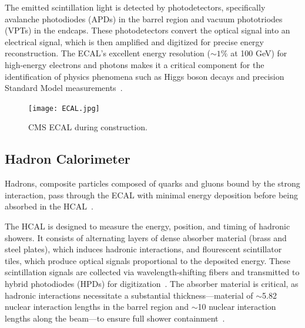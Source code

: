 The emitted scintillation light is detected by photodetectors, specifically avalanche photodiodes (APDs) in the barrel region and vacuum phototriodes (VPTs) in the endcaps. These photodetectors convert the optical signal into an electrical signal, which is then amplified and digitized for precise energy reconstruction. The ECAL’s excellent energy resolution (\(\sim1\%\) at 100 GeV) for high-energy electrons and photons makes it a critical component for the identification of physics phenomena such as Higgs boson decays and precision Standard Model measurements~\cite{CMS:ECALPerf, CMS:ECALTDR, CMS:JINST}.

\begin{figure}[!hbt]
    \begin{center}
        \texttt{[image: ECAL.jpg]}
        \caption{CMS ECAL during construction.}
        \label{fig:ECAL}
    \end{center}
\end{figure}



\subsection{Hadron Calorimeter}

Hadrons, composite particles composed of quarks and gluons bound by the strong interaction, pass through the ECAL with minimal energy deposition before being absorbed in the HCAL~\cite{CERN-LHCC-97-031, Mans:1481837}. 

The HCAL is designed to measure the energy, position, and timing of hadronic showers. It consists of alternating layers of dense absorber material (brass and steel plates), which induces hadronic interactions, and flourescent scintillator tiles, which produce optical signals proportional to the deposited energy. These scintillation signals are collected via wavelength-shifting fibers and transmitted to hybrid photodiodes (HPDs) for digitization~\cite{CERN-LHCC-97-031, Mans:1481837}. The absorber material is critical, as hadronic interactions necessitate a substantial thickness---material of $\sim$5.82 nuclear interaction lengths in the barrel region and $\sim$10 nuclear interaction lengths along the beam---to ensure full shower containment~\cite{CERN-LHCC-97-031, Mans:1481837}.

